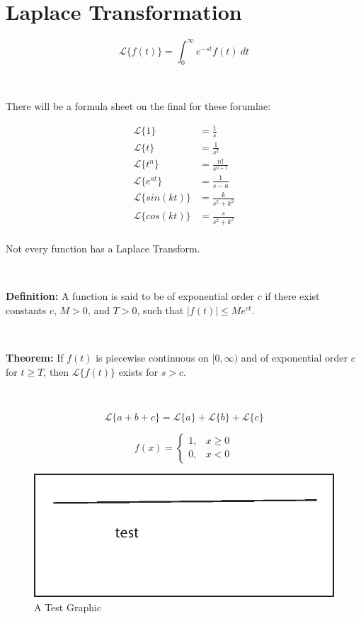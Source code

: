 \documentclass[12pt]{article}
\begin{document}
\section*{Laplace Transformation}

\begin{equation}
\mathscr{L}\{f(t)\} = \int _0^\infty e^{-st} f(t)~dt
\end{equation}

\ 

\noindent There will be a formula sheet on the final for these forumlae:

\begin{align}
\mathscr{L}\{1\} &= \frac{1}{s}\\
\mathscr{L}\{t\} &= \frac{1}{s^2}\\
\mathscr{L}\{t^n\} &= \frac{n!}{s^{n+1}}\\
\mathscr{L}\{e^{at}\} &= \frac{1}{s-a}\\
\mathscr{L}\{sin(kt)\} &= \frac{k}{s^2+k^2}\\
\mathscr{L}\{cos(kt)\} &= \frac{s}{s^2+k^2}\\
\end{align}


\noindent Not every function has a Laplace Transform.


\ 

\textbf{Definition:} A function is said to be of exponential order $c$ if there exist constants $c$, $M>0$, and $T>0$, such that $|f(t)| \leq Me^{ct}$.

\ 

\textbf{Theorem:} If $f(t)$ is piecewise continuous on $[0,\infty)$ and of exponential order $c$ for $t \geq T$, then $\mathscr{L}\{f(t)\}$ exists for $s>c$.

\ 

\begin{equation}
\mathscr{L}\{a+b+c\} = \mathscr{L}\{a\} + \mathscr{L}\{b\} + \mathscr{L}\{c\}
\end{equation}

\begin{equation}
f(x)=
\begin{cases}
1, & x \geq 0\\
0, & x < 0
\end{cases}
\end{equation}

\begin{figure}[hbt]
\centering\includegraphics{testgraphic.eps}
\caption{A Test Graphic}
\end{figure}
\end{document}
